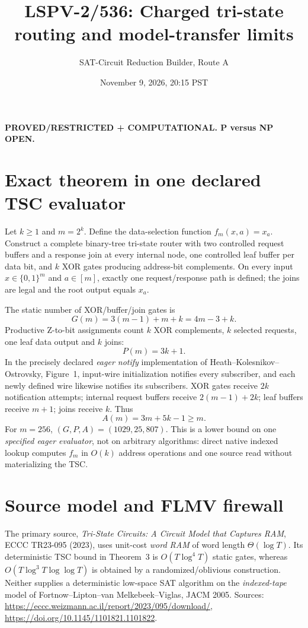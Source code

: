 \documentclass[11pt]{article}
\title{LSPV-2/536: Charged tri-state routing and model-transfer limits}
\author{SAT-Circuit Reduction Builder, Route A}
\date{November 9, 2026, 20:15 PST}
\begin{document}
\maketitle
\noindent\textbf{PROVED/RESTRICTED + COMPUTATIONAL. P versus NP OPEN.}
\section*{Exact theorem in one declared TSC evaluator}
Let $k\ge1$ and $m=2^k$. Define the data-selection function $f_m(x,a)=x_a$. Construct a complete binary-tree tri-state router with two controlled request buffers and a response join at every internal node, one controlled leaf buffer per data bit, and $k$ XOR gates producing address-bit complements. On every input $x\in\{0,1\}^m$ and $a\in[m]$, exactly one request/response path is defined; the joins are legal and the root output equals $x_a$.

The static number of XOR/buffer/join gates is
\[
G(m)=3(m-1)+m+k=4m-3+k.
\]
Productive Z-to-bit assignments count $k$ XOR complements, $k$ selected requests, one leaf data output and $k$ joins:
\[
P(m)=3k+1.
\]
In the precisely declared \emph{eager notify} implementation of Heath--Kolesnikov--Ostrovsky, Figure~1, input-wire initialization notifies every subscriber, and each newly defined wire likewise notifies its subscribers. XOR gates receive $2k$ notification attempts; internal request buffers receive $2(m-1)+2k$; leaf buffers receive $m+1$; joins receive $k$. Thus
\[
\boxed{A(m)=3m+5k-1\ge m.}
\]
For $m=256$, $(G,P,A)=(1029,25,807)$. This is a lower bound on one \emph{specified eager evaluator}, not on arbitrary algorithms: direct native indexed lookup computes $f_m$ in $O(k)$ address operations and one source read without materializing the TSC.
\section*{Source model and FLMV firewall}
The primary source, \emph{Tri-State Circuits: A Circuit Model that Captures RAM}, ECCC TR23-095 (2023), uses unit-cost \emph{word RAM} of word length $\Theta(\log T)$. Its deterministic TSC bound in Theorem~3 is $O(T\log^4 T)$ static gates, whereas $O(T\log^3 T\log\log T)$ is obtained by a randomized/oblivious construction. Neither supplies a deterministic low-space SAT algorithm on the \emph{indexed-tape} model of Fortnow--Lipton--van Melkebeek--Viglas, JACM 2005.
Sources: \url{https://eccc.weizmann.ac.il/report/2023/095/download/}, \url{https://doi.org/10.1145/1101821.1101822}.
\end{document}
